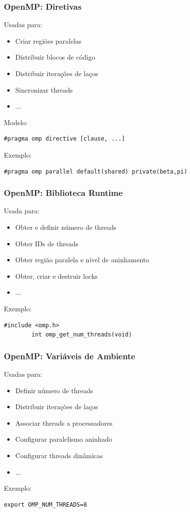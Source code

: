 \documentclass[10pt, compress, aspectratio=169, xcolor={table,usenames,dvipsnames}]{beamer}
\begin{document}
\begin{frame}[fragile]
    \frametitle{OpenMP: Diretivas}
    Usadas para:
    \begin{itemize}
        \item Criar \alert{regiões paralelas}
        \item Distribuir \alert{blocos de código}
        \item Distribuir \alert{iterações de laços}
        \item \alert{Sincronizar threads}
        \item $\dots$
    \end{itemize}

    Modelo:
    \begin{lstlisting}[basicstyle=\ttfamily]
        #pragma omp directive [clause, ...]
    \end{lstlisting}

    Exemplo:
    \begin{lstlisting}[basicstyle=\ttfamily]
        #pragma omp parallel default(shared) private(beta,pi)
    \end{lstlisting}
\end{frame}

\begin{frame}[fragile]
    \frametitle{OpenMP: Biblioteca Runtime}
    Usada para:
    \begin{itemize}
        \item Obter e definir \alert{número de threads}
        \item Obter \alert{IDs de threads}
        \item Obter \alert{região paralela e nível de aninhamento}
        \item Obter, criar e destruir \alert{locks}
        \item $\dots$
    \end{itemize}

    Exemplo:
    \begin{lstlisting}[basicstyle=\ttfamily]
        #include <omp.h>
        int omp_get_num_threads(void)
    \end{lstlisting}
\end{frame}

\begin{frame}[fragile]
    \frametitle{OpenMP: Variáveis de Ambiente}
    Usadas para:
    \begin{itemize}
        \item Definir \alert{número de threads}
        \item Distribuir \alert{iterações de laços}
        \item Associar \alert{threads a processadores}
        \item Configurar \alert{paralelismo aninhado}
        \item Configurar \alert{threads dinâmicas}
        \item $\dots$
    \end{itemize}

    Exemplo:
    \begin{lstlisting}[basicstyle=\ttfamily]
        export OMP_NUM_THREADS=8
    \end{lstlisting}
\end{frame}
\end{document}
